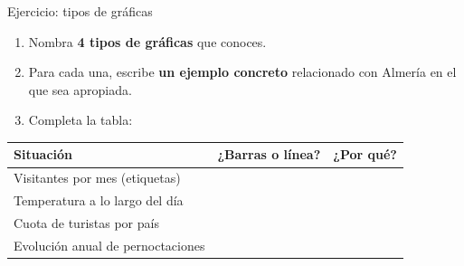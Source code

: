 \documentclass[aspectratio=169, 10pt, spanish]{beamer}
\begin{document}
\begin{frame}{Ejercicio: tipos de gráficas}
  \begin{recordarbox}
    \begin{enumerate}
      \item Nombra \textbf{4 tipos de gráficas} que conoces.
      \item Para cada una, escribe \textbf{un ejemplo concreto}
            relacionado con Almería en el que sea apropiada.
      \item Completa la tabla:
    \end{enumerate}

    \vspace{0.2cm}
    \AlmFontSmall
    \renewcommand{\arraystretch}{1.3}
    \begin{tabular}{lcc}
      \toprule
      \rowcolor{AlmAzul!12}
      \textbf{Situación} & \textbf{¿Barras o línea?} & \textbf{¿Por qué?} \\
      \midrule
      Visitantes por mes (etiquetas) & & \\
      \rowcolor{AlmFondo}
      Temperatura a lo largo del día & & \\
      Cuota de turistas por país & & \\
      \rowcolor{AlmFondo}
      Evolución anual de pernoctaciones & & \\
      \bottomrule
    \end{tabular}
  \end{recordarbox}
\end{frame}
\end{document}
